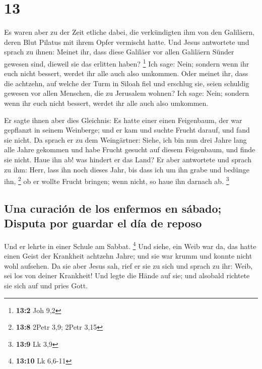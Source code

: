 \hypertarget{section-12}{%
\section{13}\label{section-12}}

 Es waren aber zu der Zeit etliche dabei, die verkündigten
ihm von den Galiläern, deren Blut Pilatus mit ihrem Opfer vermischt
hatte.  Und Jesus antwortete und sprach zu ihnen: Meinet
ihr, dass diese Galiläer vor allen Galiläern Sünder gewesen sind,
dieweil sie das erlitten haben? \footnote{\textbf{13:2} Joh 9,2}
 Ich sage: Nein; sondern wenn ihr euch nicht bessert,
werdet ihr alle auch also umkommen.  Oder meinet ihr, dass
die achtzehn, auf welche der Turm in Siloah fiel und erschlug sie, seien
schuldig gewesen vor allen Menschen, die zu Jerusalem wohnen?
 Ich sage: Nein; sondern wenn ihr euch nicht bessert,
werdet ihr alle auch also umkommen.

 Er sagte ihnen aber dies Gleichnis: Es hatte einer einen
Feigenbaum, der war gepflanzt in seinem Weinberge; und er kam und suchte
Frucht darauf, und fand sie nicht.  Da sprach er zu dem
Weingärtner: Siehe, ich bin nun drei Jahre lang alle Jahre gekommen und
habe Frucht gesucht auf diesem Feigenbaum, und finde sie nicht. Haue ihn
ab! was hindert er das Land?  Er aber antwortete und
sprach zu ihm: Herr, lass ihn noch dieses Jahr, bis dass ich um ihn
grabe und bedünge ihn, \footnote{\textbf{13:8} 2Petr 3,9; 2Petr 3,15}
 ob er wollte Frucht bringen; wenn nicht, so haue ihn
darnach ab. \footnote{\textbf{13:9} Lk 3,9}

\hypertarget{una-curaciuxf3n-de-los-enfermos-en-suxe1bado-disputa-por-guardar-el-duxeda-de-reposo}{%
\subsection{Una curación de los enfermos en sábado; Disputa por guardar
el día de
reposo}\label{una-curaciuxf3n-de-los-enfermos-en-suxe1bado-disputa-por-guardar-el-duxeda-de-reposo}}

 Und er lehrte in einer Schule am Sabbat. \footnote{\textbf{13:10}
  Lk 6,6-11}  Und siehe, ein Weib war da, das hatte einen
Geist der Krankheit achtzehn Jahre; und sie war krumm und konnte nicht
wohl aufsehen.  Da sie aber Jesus sah, rief er sie zu
sich und sprach zu ihr: Weib, sei los von deiner Krankheit!
 Und legte die Hände auf sie; und alsobald richtete sie
sich auf und pries Gott.

